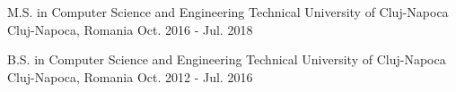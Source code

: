 

\begin{cventries}

  \cventry
    {M.S. in Computer Science and Engineering} %
    {Technical University of Cluj-Napoca} %
    {Cluj-Napoca, Romania} %
    {Oct. 2016 - Jul. 2018} %
    {
    }

  \cventry
  {B.S. in Computer Science and Engineering} %
  {Technical University of Cluj-Napoca} %
  {Cluj-Napoca, Romania} %
  {Oct. 2012 - Jul. 2016} %
  {
  }
\end{cventries}
